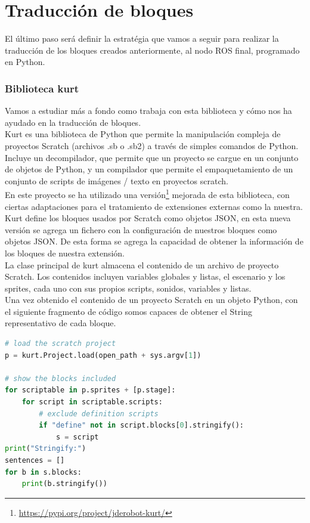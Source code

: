 \section{Traducción de bloques}
El último paso será definir la estratégia que vamos a seguir para realizar la traducción de los bloques creados anteriormente, al nodo ROS final, programado en Python.

\subsubsection{Biblioteca kurt}
\label{sec:kurt}

Vamos a estudiar más a fondo como trabaja con esta biblioteca y cómo nos ha ayudado en la traducción de bloques.\\

Kurt es una biblioteca de Python que permite la manipulación compleja de proyectos Scratch (archivos .sb o .sb2) a través de simples comandos de Python. Incluye un decompilador, que permite que un proyecto se cargue en un conjunto de objetos de Python, y un compilador que permite el empaquetamiento de un conjunto de scripts de imágenes / texto en proyectos scratch.\\

En este proyecto se ha utilizado una versión\footnote{\url{https://pypi.org/project/jderobot-kurt/}} mejorada de esta biblioteca, con ciertas adaptaciones para el tratamiento de extensiones externas como la nuestra. Kurt define los bloques usados por Scratch como objetos JSON, en esta nueva versión se agrega un fichero con la configuración de nuestros bloques como objetos JSON. De esta forma se agrega la capacidad de obtener la información de los bloques de nuestra extensión.\\

La clase principal de kurt almacena el contenido de un archivo de proyecto Scratch.
Los contenidos incluyen variables globales y listas, el escenario y los sprites, cada uno con sus propios scripts, sonidos, variables y listas.\\

Una vez obtenido el contenido de un proyecto Scratch en un objeto Python, con el siguiente fragmento de código somos capaces de obtener el String representativo de cada bloque.\\

\begin{lstlisting}[language=python,firstnumber=1]
# load the scratch project
p = kurt.Project.load(open_path + sys.argv[1])

# show the blocks included
for scriptable in p.sprites + [p.stage]:
	for script in scriptable.scripts:
		# exclude definition scripts
		if "define" not in script.blocks[0].stringify():
			s = script
print("Stringify:")
sentences = []
for b in s.blocks:
	print(b.stringify())
\end{lstlisting}

